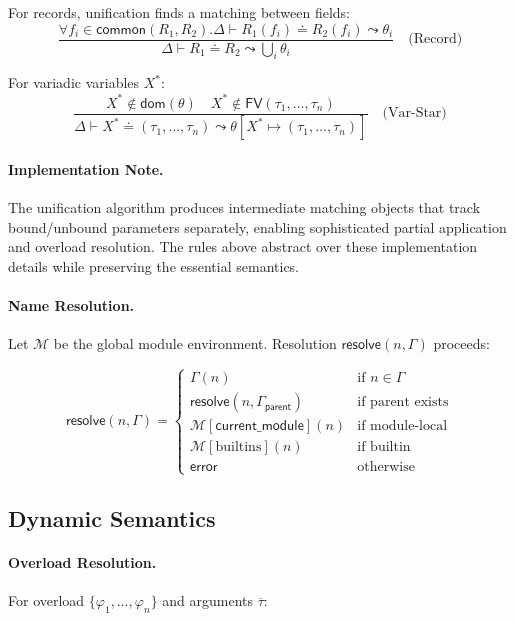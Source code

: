 For records, unification finds a matching between fields:
\[
\frac{\forall f_i \in \mathsf{common}(R_1, R_2). \Delta \vdash R_1(f_i) \doteq R_2(f_i) \leadsto \theta_i}{\Delta \vdash R_1 \doteq R_2 \leadsto \bigcup_i \theta_i} \quad \text{(Record)}
\]

For variadic variables $X^*$:
\[
\frac{X^* \notin \mathsf{dom}(\theta) \quad X^* \notin \mathsf{FV}(\tau_1, \ldots, \tau_n)}{\Delta \vdash X^* \doteq (\tau_1, \ldots, \tau_n) \leadsto \theta[X^* \mapsto (\tau_1, \ldots, \tau_n)]} \quad \text{(Var-Star)}
\]

\paragraph{Implementation Note.} The unification algorithm produces intermediate matching objects that track bound/unbound parameters separately, enabling sophisticated partial application and overload resolution. The rules above abstract over these implementation details while preserving the essential semantics.

\paragraph{Name Resolution.} Let $\mathcal{M}$ be the global module environment. Resolution $\mathsf{resolve}(n, \Gamma)$ proceeds:

\[
\mathsf{resolve}(n, \Gamma) = \begin{cases}
\Gamma(n) & \text{if } n \in \Gamma \\
\mathsf{resolve}(n, \Gamma_{\mathsf{parent}}) & \text{if parent exists} \\
\mathcal{M}[\mathsf{current\_module}](n) & \text{if module-local} \\
\mathcal{M}[\text{builtins}](n) & \text{if builtin} \\
\mathsf{error} & \text{otherwise}
\end{cases}
\]

\subsection{Dynamic Semantics}

\paragraph{Overload Resolution.} For overload $\{\varphi_1, \ldots, \varphi_n\}$ and arguments $\overline{\tau}$:

